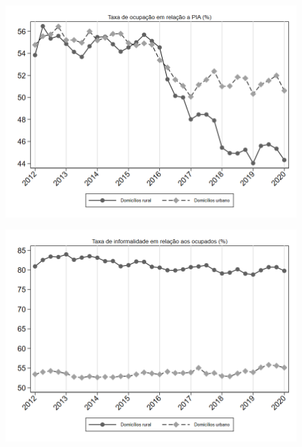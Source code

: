 \begin{frame}[label=_composicao_demografica_rural_urbano_taxa_de_ocupacao]{}
\textit{\hyperlink{_composicao_demografica_rural_urbano}{}}
\begin{figure}
  \centering
  \includegraphics[width=1\linewidth]{../../analysis/output/composicao_demografica/area_geografica/_composicao_demografica_rural_urbano_taxa_de_ocupacao.png}
  \caption{}
  \label{fig:_composicao_demografica_rural_urbano_taxa_de_ocupacao}
\end{figure}
\end{frame}

\begin{frame}[label=_composicao_demografica_rural_urbano_taxa_de_informalidade]{}
\textit{\hyperlink{_composicao_demografica_rural_urbano}{}}
\begin{figure}
  \centering
  \includegraphics[width=1.0\linewidth]{../../analysis/output/composicao_demografica/area_geografica/_composicao_demografica_rural_urbano_taxa_de_informalidade.png}
  \caption{}
  \label{fig:_composicao_demografica_rural_urbano_taxa_de_informalidade}
\end{figure}
\end{frame}


